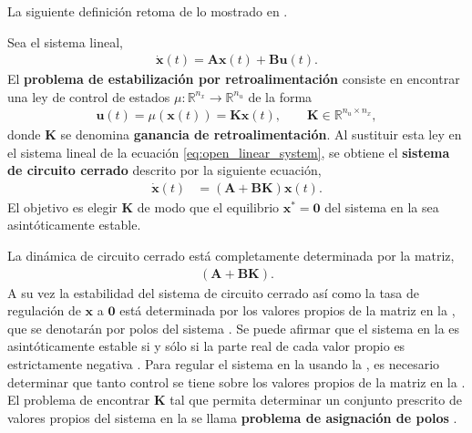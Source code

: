 La siguiente definición retoma de lo mostrado en \cite{Gruene2021, capella2020clase}.

\begin{definition}
    Sea el sistema lineal,
    \begin{align}
        \dot{\mathbf{x}}(t) = \mathbf{A}\mathbf{x}(t) + \mathbf{B}\mathbf{u}(t).
        \label{eq:open_linear_system}
    \end{align}
    El \textbf{problema de estabilización por retroalimentación} consiste en encontrar una ley de control de estados $\mu:\mathbb{R}^{n_x}\rightarrow\mathbb{R}^{n_u}$ de la forma
    \begin{align}
        \label{eq:state-feedback}
        \mathbf{u}(t)=\mu(\mathbf{x}(t))=\mathbf{K}\mathbf{x}(t), \qquad \mathbf{K}\in\mathbb{R}^{n_u\times n_x},
    \end{align}
    donde $\mathbf{K}$ se denomina \textbf{ganancia de retroalimentación}. Al sustituir esta ley en el sistema lineal de la ecuación \ref{eq:open_linear_system}, se obtiene el \textbf{sistema de circuito cerrado} descrito por la siguiente ecuación, 
    \begin{align}
    \label{eq:closed-loop}
        \dot{\mathbf{x}}(t) &= (\mathbf{A} + \mathbf{BK})\mathbf{x}(t).
    \end{align}
    El objetivo es elegir $\mathbf{K}$ de modo que el equilibrio $\mathbf{x}^{*}=\mathbf{0}$ del sistema en la  sea asintóticamente estable.
\end{definition}
La dinámica de circuito cerrado está completamente determinada por la matriz,  \begin{align}
(\mathbf{A}+\mathbf{B K}).
\label{eq:matrix_abk}
\end{align}
A su vez la estabilidad del sistema de circuito cerrado así como la tasa de regulación de $\mathbf{x}$ a $\mathbf{0}$ está determinada por los valores propios de la matriz en la , que se denotarán por polos del sistema \cite{Kwong2008}. Se puede afirmar que el sistema en la  es asintóticamente estable si y sólo si la parte real de cada valor propio es estrictamente negativa \cite{Gruene2021}. Para regular el sistema en la  usando la , es necesario determinar que tanto control se tiene sobre los valores propios de la matriz en la  \cite{Kwong2008}. El problema de encontrar $\mathbf{K}$ tal que permita determinar un conjunto prescrito de valores propios del sistema en la  se llama \textbf{problema de asignación de polos} \cite{Kwong2008}. 

